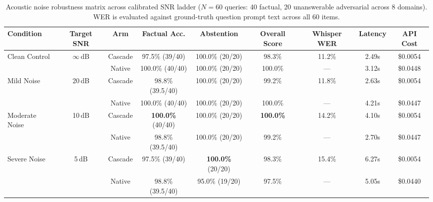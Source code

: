 \begin{table}[t]
\centering
\small
\caption{Acoustic noise robustness matrix across calibrated SNR ladder ($N = 60$ queries: 40 factual, 20 unanswerable adversarial across 8 domains). WER is evaluated against ground-truth question prompt text across all 60 items.}
\label{tab:noise}
\begin{tabular}{lcccccccc}
\toprule
\textbf{Condition} & \textbf{Target SNR} & \textbf{Arm} & \textbf{Factual Acc.} & \textbf{Abstention} & \textbf{Overall Score} & \textbf{Whisper WER} & \textbf{Latency} & \textbf{API Cost} \\
\midrule
Clean Control & $\infty$\,dB & Cascade & 97.5\% (39/40) & 100.0\% (20/20) & 98.3\% & 11.2\% & 2.49s & \$0.0054 \\
 & & Native & 100.0\% (40/40) & 100.0\% (20/20) & 100.0\% & --- & 3.12s & \$0.0448 \\
\midrule
Mild Noise & 20\,dB & Cascade & 98.8\% (39.5/40) & 100.0\% (20/20) & 99.2\% & 11.8\% & 2.63s & \$0.0054 \\
 & & Native & 100.0\% (40/40) & 100.0\% (20/20) & 100.0\% & --- & 4.21s & \$0.0447 \\
\midrule
Moderate Noise & 10\,dB & Cascade & \textbf{100.0\%} (40/40) & 100.0\% (20/20) & \textbf{100.0\%} & 14.2\% & 4.10s & \$0.0054 \\
 & & Native & 98.8\% (39.5/40) & 100.0\% (20/20) & 99.2\% & --- & 2.70s & \$0.0447 \\
\midrule
Severe Noise & 5\,dB & Cascade & 97.5\% (39/40) & \textbf{100.0\%} (20/20) & 98.3\% & 15.4\% & 6.27s & \$0.0054 \\
 & & Native & 98.8\% (39.5/40) & 95.0\% (19/20) & 97.5\% & --- & 5.05s & \$0.0440 \\
\bottomrule
\end{tabular}
\end{table}
